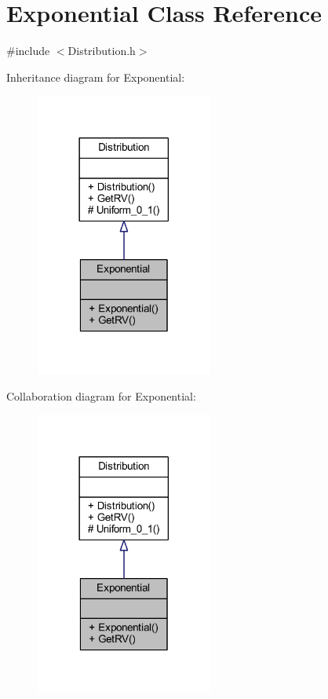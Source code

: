 \hypertarget{class_exponential}{}\section{Exponential Class Reference}
\label{class_exponential}


{\ttfamily \#include $<$Distribution.\+h$>$}



Inheritance diagram for Exponential\+:\nopagebreak
\begin{figure}[H]
\begin{center}
\leavevmode
\includegraphics[width=165pt]{class_exponential__inherit__graph}
\end{center}
\end{figure}


Collaboration diagram for Exponential\+:\nopagebreak
\begin{figure}[H]
\begin{center}
\leavevmode
\includegraphics[width=165pt]{class_exponential__coll__graph}
\end{center}
\end{figure}
